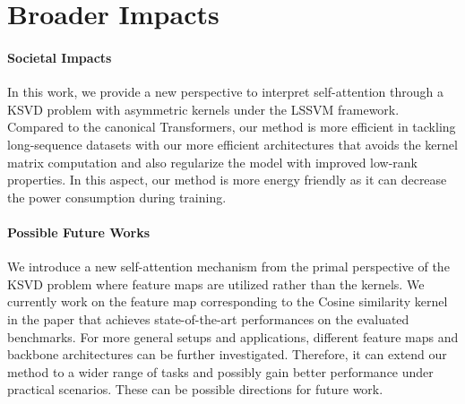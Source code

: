 \documentclass{article}
\begin{document}
\begin{table}[t]
\caption{Architecture of Primal. on different datasets.}
\label{tab::arch}
\begin{center}
\end{center}
\vspace{-5mm}
\end{table}



\section{Broader Impacts} \label{sec::broader_impact}

\paragraph{Societal Impacts}
In this work, we provide a new perspective to interpret self-attention through a KSVD problem with asymmetric kernels under the LSSVM framework. 
Compared to the canonical Transformers, our method is more efficient in tackling long-sequence datasets with our more efficient architectures that avoids the kernel matrix computation and also regularize the model with improved low-rank properties.
In this aspect, our method is more energy friendly as it can decrease the power consumption during training.



\paragraph{Possible Future Works}
We introduce a new self-attention mechanism from the primal perspective of the KSVD problem where feature maps are utilized rather than the kernels.
We currently work on the feature map corresponding to the Cosine similarity kernel in the paper that achieves state-of-the-art performances on the evaluated benchmarks. 
For more general setups and applications,  different feature maps and backbone architectures can be further investigated.
Therefore, it can extend our method to a wider range of tasks and possibly gain better performance under practical scenarios. 
These can be possible directions for future work.













		
\end{document}
